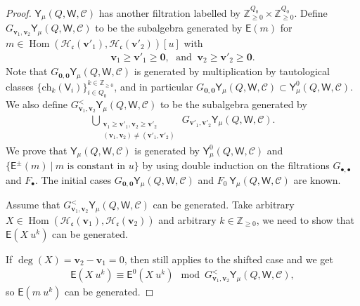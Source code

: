 \documentclass[10pt]{amsart}
\theoremstyle{definition}
\numberwithin{equation}{section}
\newcommand{\bZ}{\mathbb{Z}}
\newcommand{\bv}{\mathbf{v}}
\newcommand{\cH}{\mathcal{H}}
\newcommand{\sW}{\mathsf{W}}
\newcommand{\Hom}{\operatorname{Hom}}
\begin{document}
\begin{proof}
$\mathsf Y_\mu(Q,\sW,\mathcal C)$ has another filtration labelled by $\bZ_{\geqslant 0}^{Q_0}\times \bZ_{\geqslant 0}^{Q_0}$. Define $G_{\bv_1,\bv_2}\mathsf Y_\mu(Q,\sW,\mathcal C)$ to be the subalgebra generated by $\mathsf E(m)$ for $m\in \Hom(\cH_{\mathfrak{c}}(\bv'_1),\cH_{\mathfrak{c}}(\bv'_2))[u]$ with 
\begin{align*}
    \bv_1\geqslant \bv'_1\geqslant\mathbf 0,\;\text{ and }\: \bv_2\geqslant \bv'_2\geqslant\mathbf 0.
\end{align*}
Note that $G_{\mathbf 0,\mathbf 0}\mathsf Y_\mu(Q,\sW,\mathcal C)$ is generated by multiplication by tautological classes $\{\mathrm{ch}_k(\mathsf V_i)\}_{i\in Q_0}^{k\in \bZ_{\geqslant 0}}$, and in particular $G_{\mathbf 0,\mathbf 0}\mathsf Y_\mu(Q,\sW,\mathcal C)\subset \mathsf Y^0_\mu(Q,\sW,\mathcal C)$. We also define $G^<_{\bv_1,\bv_2}\mathsf Y_\mu(Q,\sW,\mathcal C)$ to be the subalgebra generated by 
\begin{align*}
    \bigcup_{\substack{\bv_1\geqslant \bv'_1,\bv_2\geqslant \bv'_2\\ (\bv_1,\bv_2)\neq (\bv'_1,\bv'_2)}} \:G_{\bv'_1,\bv'_2}\mathsf Y_\mu(Q,\sW,\mathcal C).
\end{align*}
We prove that $\mathsf Y_\mu(Q,\sW,\mathcal C)$ is generated by $\mathsf Y^0_\mu(Q,\sW,\mathcal C)$ and $\{\mathsf E^{\pm}(m)\:|\: m\text{ is constant in }u\}$ by using double induction on the filtrations $G_{\bullet,\bullet}$ and $F_\bullet$. The initial cases $G_{\mathbf 0,\mathbf 0}\mathsf Y_\mu(Q,\sW,\mathcal C)$ and $F_0\:\mathsf Y_\mu(Q,\sW,\mathcal C)$ are known.


Assume that $G^<_{\bv_1,\bv_2}\mathsf Y_\mu(Q,\sW,\mathcal C)$ can be generated. Take arbitrary $X\in \Hom(\cH_{\mathfrak{c}}(\bv_1),\cH_{\mathfrak{c}}(\bv_2))$ and arbitrary $k\in \bZ_{\geqslant 0}$, we need to show that $\mathsf E(X\: u^k)$ can be generated.

If $\deg(X)=\bv_2-\bv_1=0$, then \cite[(4.34)]{MO} still applies to the shifted case and we get
\begin{align*}
    \mathsf E(X\: u^k)\equiv \mathsf E^{0}(X\: u^k)\mod G^<_{\bv_1,\bv_2}\mathsf Y_\mu(Q,\sW,\mathcal C),
\end{align*}
so $\mathsf E(m\: u^k)$ can be generated.


\end{proof}
\end{document}
